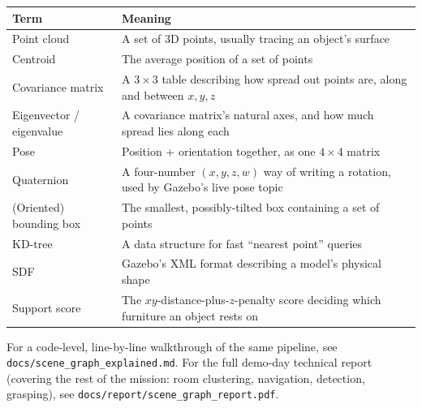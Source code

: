 \documentclass[11pt]{article}
\begin{document}
\begin{center}
\begin{tabular}{@{}p{3.6cm}p{10.5cm}@{}}
\toprule
\textbf{Term} & \textbf{Meaning} \\
\midrule
Point cloud & A set of 3D points, usually tracing an object's surface \\
Centroid & The average position of a set of points \\
Covariance matrix & A $3\times3$ table describing how spread out points are, along and between $x,y,z$ \\
Eigenvector / eigenvalue & A covariance matrix's natural axes, and how much spread lies along each \\
Pose & Position + orientation together, as one $4\times4$ matrix \\
Quaternion & A four-number $(x,y,z,w)$ way of writing a rotation, used by Gazebo's live pose topic \\
(Oriented) bounding box & The smallest, possibly-tilted box containing a set of points \\
KD-tree & A data structure for fast ``nearest point'' queries \\
SDF & Gazebo's XML format describing a model's physical shape \\
Support score & The $xy$-distance-plus-$z$-penalty score deciding which furniture an object rests on \\
\bottomrule
\end{tabular}
\end{center}

\bigskip
\noindent For a code-level, line-by-line walkthrough of the same pipeline,
see \texttt{docs/scene\_graph\_explained.md}. For the full demo-day technical
report (covering the rest of the mission: room clustering, navigation,
detection, grasping), see \texttt{docs/report/scene\_graph\_report.pdf}.
\end{document}
